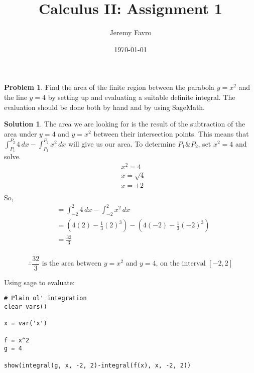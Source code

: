 \documentclass[10pt]{article}
\title{Calculus II: Assignment 1}
\author{Jeremy Favro}
\date{\today}
\theoremstyle{definition}
\newtheorem{problem}{Problem}
\newtheorem{soln}{Solution}
\begin{document}
\maketitle

\begin{problem}
Find the area of the finite region between the parabola $y = x^2$ and the line $y = 4$ by setting
up and evaluating a suitable definite integral. The evaluation should be done both by hand
and by using SageMath.
\end{problem}
\begin{soln} The area we are looking for is the result of the subtraction of the area under $y=4$ and $y=x^2$ between their intersection points.
    This means that $\int_{P_1}^{P_2} 4 \,dx - \int_{P_1}^{P_2} x^2 \,dx$ will give us our area.
    To determine $P_1 \& P_2$, set $x^2=4$ and solve.
    \begin{align*}
         & x^2=4      \\
         & x=\sqrt{4} \\
         & x=\pm 2    \\
    \end{align*}
    So,
    \begin{align*}
         & = \int_{-2}^{2} 4 \,dx - \int_{-2}^{2} x^2 \,dx           \\
         & = (4(2) - \frac{1}{3}(2)^3) - (4(-2) - \frac{1}{3}(-2)^3) \\
         & = \frac{32}{3}                                            \\
    \end{align*}

    $$\therefore \frac{32}{3} \text{ is the area between } y = x^2 \text{ and } y = 4 \text{, on the interval } [-2,2]$$

    \noindent Using sage to evaluate:

    \begin{verbatim}
# Plain ol' integration 
clear_vars()
        
x = var('x')
        
f = x^2
g = 4
        
show(integral(g, x, -2, 2)-integral(f(x), x, -2, 2))
    \end{verbatim}
\end{soln}
\end{document}
